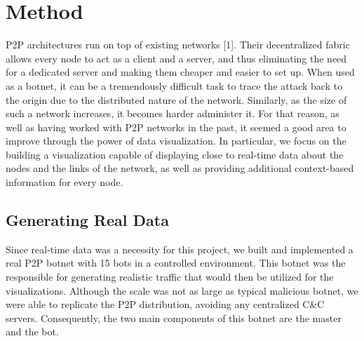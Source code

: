 \documentclass{proc}
\begin{document}
\section{Method}
P2P architectures run on top of existing networks [1]. Their decentralized fabric allows every node to act as a client and a server, and thus eliminating the need for a dedicated server and making them cheaper and easier to set up. When used as a botnet, it can be a tremendously difficult task to trace the attack back to the origin due to the distributed nature of the network. Similarly, as the size of such a network increases, it becomes harder administer it. For that reason, as well as having worked with P2P networks in the past, it seemed a good area to improve through the power of data visualization. In particular, we focus on the building a visualization capable of displaying close to real-time data about the nodes and the links of the network, as well as providing additional context-based information for every node. 

\subsection{Generating Real Data}
Since real-time data was a necessity for this project, we built and implemented a real P2P botnet with 15 bots in a controlled environment. This botnet was the responsible for generating realistic traffic that would then be utilized for the visualizations. Although the scale was not as large as typical malicious botnet, we were able to replicate the P2P distribution, avoiding any centralized C&C servers. Consequently, the two main components of this botnet are the master and the bot.
\end{document}
